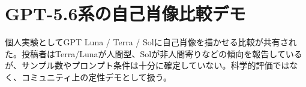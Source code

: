 \section{GPT-5.6系の自己肖像比較デモ}
個人実験としてGPT Luna / Terra / Solに自己肖像を描かせる比較が共有された。投稿者はTerra/Lunaが人間型、Solが非人間寄りなどの傾向を報告しているが、サンプル数やプロンプト条件は十分に確定していない。科学的評価ではなく、コミュニティ上の定性デモとして扱う。
